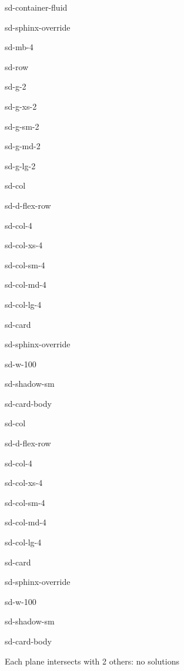 \documentclass[letterpaper,10pt,english]{jupyterBook}
\begin{document}
\begin{sphinxuseclass}{sd-container-fluid}
\begin{sphinxuseclass}{sd-sphinx-override}
\begin{sphinxuseclass}{sd-mb-4}
\begin{sphinxuseclass}{sd-row}
\begin{sphinxuseclass}{sd-g-2}
\begin{sphinxuseclass}{sd-g-xs-2}
\begin{sphinxuseclass}{sd-g-sm-2}
\begin{sphinxuseclass}{sd-g-md-2}
\begin{sphinxuseclass}{sd-g-lg-2}
\begin{sphinxuseclass}{sd-col}
\begin{sphinxuseclass}{sd-d-flex-row}
\begin{sphinxuseclass}{sd-col-4}
\begin{sphinxuseclass}{sd-col-xs-4}
\begin{sphinxuseclass}{sd-col-sm-4}
\begin{sphinxuseclass}{sd-col-md-4}
\begin{sphinxuseclass}{sd-col-lg-4}
\begin{sphinxuseclass}{sd-card}
\begin{sphinxuseclass}{sd-sphinx-override}
\begin{sphinxuseclass}{sd-w-100}
\begin{sphinxuseclass}{sd-shadow-sm}
\begin{sphinxuseclass}{sd-card-body}
\end{sphinxuseclass}
\end{sphinxuseclass}
\end{sphinxuseclass}
\end{sphinxuseclass}
\end{sphinxuseclass}
\end{sphinxuseclass}
\end{sphinxuseclass}
\end{sphinxuseclass}
\end{sphinxuseclass}
\end{sphinxuseclass}
\end{sphinxuseclass}
\end{sphinxuseclass}
\begin{sphinxuseclass}{sd-col}
\begin{sphinxuseclass}{sd-d-flex-row}
\begin{sphinxuseclass}{sd-col-4}
\begin{sphinxuseclass}{sd-col-xs-4}
\begin{sphinxuseclass}{sd-col-sm-4}
\begin{sphinxuseclass}{sd-col-md-4}
\begin{sphinxuseclass}{sd-col-lg-4}
\begin{sphinxuseclass}{sd-card}
\begin{sphinxuseclass}{sd-sphinx-override}
\begin{sphinxuseclass}{sd-w-100}
\begin{sphinxuseclass}{sd-shadow-sm}
\begin{sphinxuseclass}{sd-card-body}


\begin{figure}[htbp]
\centering

\noindent{}
\end{figure}

\sphinxAtStartPar
Each plane intersects with 2 others: no solutions


\end{sphinxuseclass}
\end{sphinxuseclass}
\end{sphinxuseclass}
\end{sphinxuseclass}
\end{sphinxuseclass}
\end{sphinxuseclass}
\end{sphinxuseclass}
\end{sphinxuseclass}
\end{sphinxuseclass}
\end{sphinxuseclass}
\end{sphinxuseclass}
\end{sphinxuseclass}
\end{sphinxuseclass}
\end{sphinxuseclass}
\end{sphinxuseclass}
\end{sphinxuseclass}
\end{sphinxuseclass}
\end{sphinxuseclass}
\end{sphinxuseclass}
\end{sphinxuseclass}
\end{sphinxuseclass}
\end{document}
